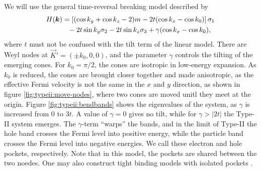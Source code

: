 We will use the general time-reversal breaking model described by \textcite{mccormickMinimalModelsTopological2017}
\begin{equation}
  \begin{split}
    H(\vec{k}) &= \left[ ( \cos k_y + \cos k_z - 2 )m - 2 t (\cos k_x - \cos k_0) \right] \sigma_1\\
    &\pe - 2 t \sin k_y \sigma_2 - 2t \sin k_z \sigma_3
    + \gamma (\cos k_x - \cos k_0),
  \end{split}
\end{equation}
where \( t \) must not be confused with the tilt term of the linear model.
There are Weyl nodes at \(\vec{K}' = (\pm k_{0}, 0,0)\), and the parameter $\gamma$ controls the tilting of the emerging cones.
For \( k_0 = \pi /2 \), the cones are isotropic in low-energy expansion.
As \( k_0 \) is reduced, the cones are brought closer together and made anisotropic, as the effective Fermi velocity is not the same in the \( x \) and \( y \) direction, as shown in figure \ref{fig:typeii:move-nodes}, where two cones are moved unitl they meet at the origin.
Figure \ref{fig:typeii:bendbands} shows the eigenvalues of the system, as \( \gamma \) is increased from 0 to \( 3t \).
A value of $\gamma=0$ gives no tilt, while for $\gamma > |2 t|$ the Type-II system emerges.
The \(\gamma\)-term ``warps'' the bands, and in the limit of Type-II the hole band crosses the Fermi level into positive energy, while the particle band crosses the Fermi level into negative energies.
We call these electron and hole pockets, respectively.
Note that in this model, the pockets are shared between the two noedes.
One may also construct tight binding models with isolated pockets \cite{mccormickMinimalModelsTopological2017}.

